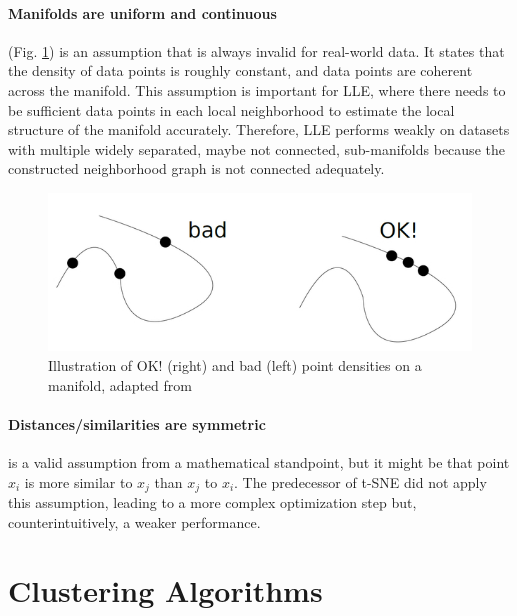 \paragraph{Manifolds are uniform and continuous} (Fig. \ref{fig:uniform_manifold}) is an assumption that is always invalid for real-world data. It states that the density of data points is roughly constant, and data points are coherent across the manifold. This assumption is important for LLE, where there needs to be sufficient data points in each local neighborhood to estimate the local structure of the manifold accurately. Therefore, LLE performs weakly on datasets with multiple widely separated, maybe not connected, sub-manifolds because the constructed neighborhood graph is not connected adequately. \cite{t-SNE08}
\begin{figure}[!]
	\centering
	\includegraphics[width=1\columnwidth]{images/uniform_manifold.jpg}
	\caption[Uniform and Continuous Manifold]{Illustration of OK! (right) and bad (left) point densities on a manifold, adapted from \footnotemark}
    \label{fig:uniform_manifold}
\end{figure}

\paragraph{Distances/similarities are symmetric} is a valid assumption from a mathematical standpoint, but it might be that point $x_i$ is more similar to $x_j$ than $x_j$ to $x_i$. The predecessor of t-SNE did not apply this assumption, leading to a more complex optimization step but, counterintuitively, a weaker performance. \cite{t-SNE08}

\section{Clustering Algorithms} \label{sec:clustering}

